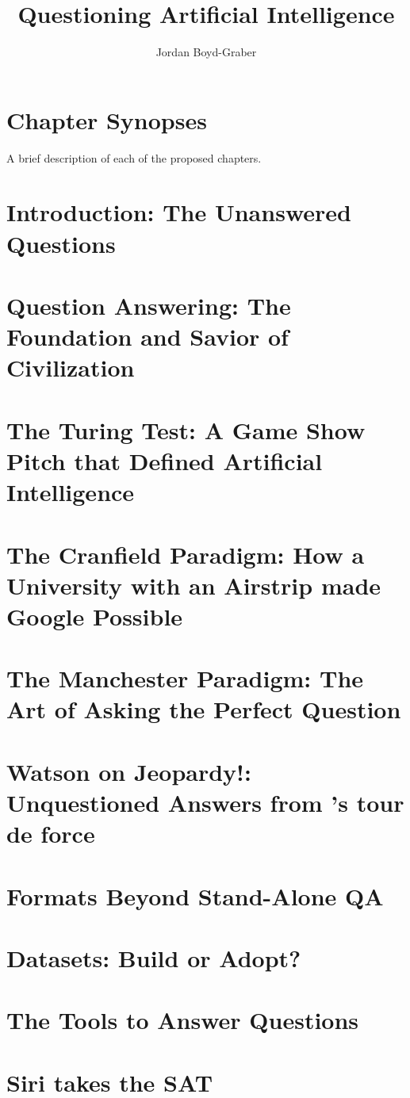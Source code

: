 \documentclass[bfivepaper,twosided,justified,nobib]{style/tufte-book}
\title{Questioning Artificial Intelligence}
\author{Jordan Boyd-Graber}
\newif\ifproposal\proposaltrue
\newcommand{\proposalpart}[2]{
  \ifproposal
  \else
  \part{#1}
  \fi
}
\newcommand{\chapterfile}[3]{
  \ifproposal
      \begingroup
      \renewcommand{\cleardoublepage}{}
      \renewcommand{\clearpage}{}
      \chapter{#3}\label{chap:#2}
      \endgroup
      \vspace{-0.5cm}
      
      \vspace{-2.5cm}
  \else
      \chapter{#3}
      \label{ch:#2}
      \begin{quote}
        
      \end{quote} 
      
  \fi}
\begin{document}
\setcounter{secnumdepth}{1}







\clearpage
\ifproposal

  \chapter{Chapter Synopses}

  \setcounter{chapter}{0}

  \titleformat{\chapter}[display]
  {\normalfont%
      \normalsize %
      \bfseries}{}{20pt}{%
      \normalsize \thechapter: %
      }
  
  A brief description of each of the proposed chapters.
  \else
  
\fi


\chapterfile{010}{introduction}{Introduction: The Unanswered Questions}

\proposalpart{Question Answering Before Computers}{1}

\chapterfile{110}{history}{Question Answering: The Foundation and Savior of Civilization}


\chapterfile{120}{turing}{The Turing Test: A Game Show Pitch that
  Defined Artificial Intelligence}

\chapterfile{130}{ir}{The Cranfield Paradigm: How a University with an Airstrip made Google Possible}

\chapterfile{140}{manchester}{The Manchester Paradigm: The Art of Asking the Perfect Question}


  \proposalpart{Question Answering Present}{2}

  \chapterfile{200}{watson}{Watson on Jeopardy!: \\ Unquestioned Answers from \abr{ibm}'s tour de force}

  \chapterfile{210}{formats}{Formats Beyond Stand-Alone QA}

\chapterfile{220}{datasets}{Datasets: Build or Adopt?}    

\chapterfile{230}{methods}{The Tools to Answer Questions}


\chapterfile{240}{leaderboards}{Siri takes the SAT}
\end{document}
